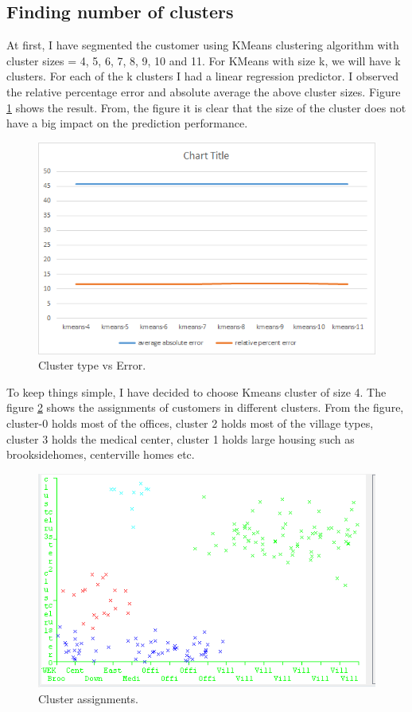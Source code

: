 \subsection{Finding number of clusters}

At first, I have segmented the customer using KMeans clustering algorithm with cluster sizes = 4, 5, 6, 7, 8, 9, 10 and 11. For KMeans with size k, we will have k clusters. For each of the k clusters I had a linear regression predictor. I observed the relative percentage error and absolute average the above cluster sizes. Figure \ref{fig:cluster-type-vs-error} shows the result. From, the figure it is clear that the size of the cluster does not have a big impact on the prediction performance.

\begin{figure}[h!]
  \includegraphics[width=\linewidth]{cluster-types-vs-error.png}
  \caption{Cluster type vs Error.}
  \label{fig:cluster-type-vs-error}
\end{figure}

To keep things simple, I have decided to choose Kmeans cluster of size 4. The figure \ref{fig:4-cluster-with-10-files} shows the assignments of customers in different clusters. From the figure, cluster-0 holds most of the offices, cluster 2 holds most of the village types, cluster 3 holds the medical center, cluster 1 holds large housing such as brooksidehomes, centerville homes etc.

\begin{figure}[h!]
  \includegraphics[width=\linewidth]{4-cluster-with-10-files.png}
  \caption{Cluster assignments.}
  \label{fig:4-cluster-with-10-files}
\end{figure}

